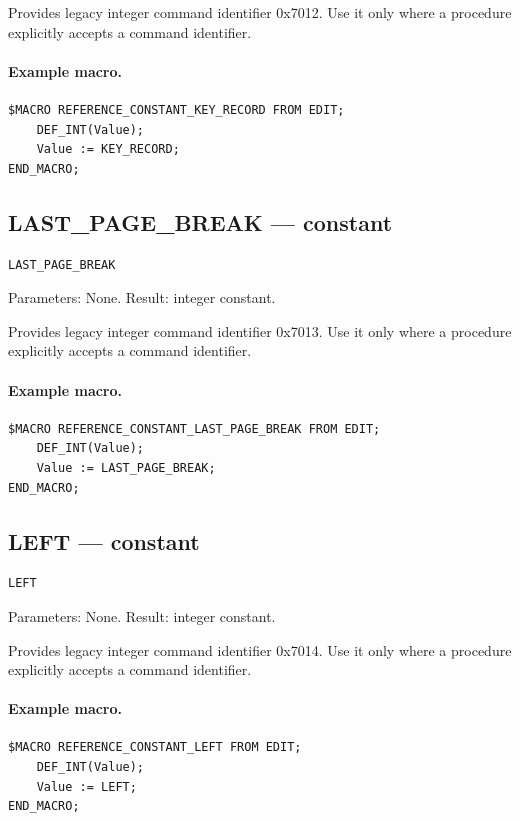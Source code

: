 \documentclass[a4paper,10pt,twoside,openany]{book}
\begin{document}
Provides legacy integer command identifier 0x7012. Use it only where a procedure explicitly accepts a command identifier.

\paragraph{Example macro.}
\begin{verbatim}
$MACRO REFERENCE_CONSTANT_KEY_RECORD FROM EDIT;
    DEF_INT(Value);
    Value := KEY_RECORD;
END_MACRO;
\end{verbatim}

\label{prim:constant-last-page-break}
\subsection*{LAST\_PAGE\_BREAK --- constant}
\begin{verbatim}
LAST_PAGE_BREAK
\end{verbatim}
Parameters: None. Result: integer constant.

Provides legacy integer command identifier 0x7013. Use it only where a procedure explicitly accepts a command identifier.

\paragraph{Example macro.}
\begin{verbatim}
$MACRO REFERENCE_CONSTANT_LAST_PAGE_BREAK FROM EDIT;
    DEF_INT(Value);
    Value := LAST_PAGE_BREAK;
END_MACRO;
\end{verbatim}

\label{prim:constant-left}
\subsection*{LEFT --- constant}
\begin{verbatim}
LEFT
\end{verbatim}
Parameters: None. Result: integer constant.

Provides legacy integer command identifier 0x7014. Use it only where a procedure explicitly accepts a command identifier.

\paragraph{Example macro.}
\begin{verbatim}
$MACRO REFERENCE_CONSTANT_LEFT FROM EDIT;
    DEF_INT(Value);
    Value := LEFT;
END_MACRO;
\end{verbatim}
\end{document}
